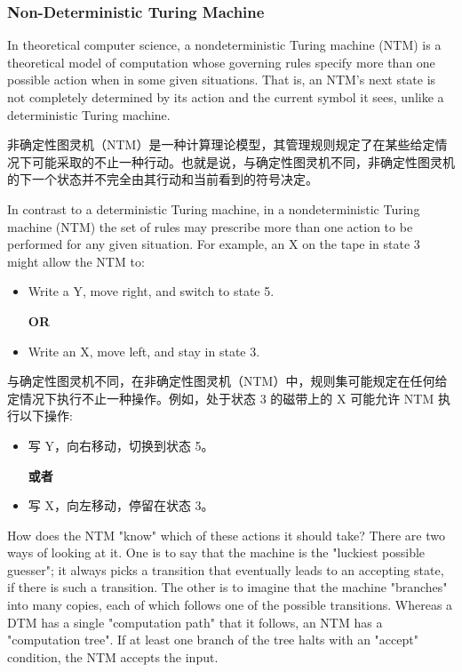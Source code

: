 \documentclass{article}
\begin{document}
\subsubsection{Non-Deterministic Turing Machine}
In theoretical computer science, a nondeterministic Turing machine (NTM) is a theoretical model of computation whose governing rules specify more than one possible action when in some given situations. That is, an NTM's next state is not completely determined by its action and the current symbol it sees, unlike a deterministic Turing machine.\par
非确定性图灵机（NTM）是一种计算理论模型，其管理规则规定了在某些给定情况下可能采取的不止一种行动。也就是说，与确定性图灵机不同，非确定性图灵机的下一个状态并不完全由其行动和当前看到的符号决定。\par
\hspace*{\fill}\par
In contrast to a deterministic Turing machine, in a nondeterministic Turing machine (NTM) the set of rules may prescribe more than one action to be performed for any given situation. For example, an X on the tape in state 3 might allow the NTM to:\par
\begin{itemize}
    \item Write a Y, move right, and switch to state 5.\par
    \textbf{OR}
    \item Write an X, move left, and stay in state 3.
\end{itemize}
与确定性图灵机不同，在非确定性图灵机（NTM）中，规则集可能规定在任何给定情况下执行不止一种操作。例如，处于状态 3 的磁带上的 X 可能允许 NTM 执行以下操作:\par
\begin{itemize}
    \item 写 Y，向右移动，切换到状态 5。\par
    \textbf{或者}
    \item 写 X，向左移动，停留在状态 3。
\end{itemize}
\hspace*{\fill}\par
How does the NTM "know" which of these actions it should take? There are two ways of looking at it. One is to say that the machine is the "luckiest possible guesser"; it always picks a transition that eventually leads to an accepting state, if there is such a transition. The other is to imagine that the machine "branches" into many copies, each of which follows one of the possible transitions. Whereas a DTM has a single "computation path" that it follows, an NTM has a "computation tree". If at least one branch of the tree halts with an "accept" condition, the NTM accepts the input.\par
\end{document}
